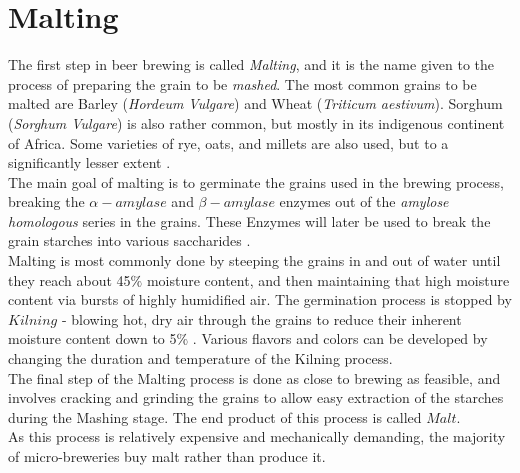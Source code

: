 \documentclass[twoside]{ctuthesis}
\theoremstyle{plain}
\theoremstyle{definition}
\theoremstyle{note}
\begin{document}
\section{Malting}
The first step in beer brewing is called \textit{Malting}, and it is the name given to the process of preparing the grain to be \textit{mashed}. The most common grains to be malted are Barley (\textit{Hordeum Vulgare}) and Wheat (\textit{Triticum aestivum}). Sorghum (\textit{Sorghum Vulgare}) is also rather common, but mostly in its indigenous continent of Africa. Some varieties of rye, oats, and millets are also used, but to a significantly lesser extent \cite{Brewing_Science}.\\
The main goal of malting is to germinate the grains used in the brewing process, breaking the $\alpha-amylase$ and $\beta-amylase$ enzymes out of the \textit{amylose homologous} series in the grains. These Enzymes will later be used to break the grain starches into various saccharides .\\
Malting is most commonly done by steeping the grains in and out of water until they reach about 45$\%$ moisture content, and then maintaining that high moisture content via bursts of highly humidified air. The germination process is stopped by $Kilning$ - blowing hot, dry air through the grains to reduce their inherent moisture content down to 5$\%$ \cite{Malting_Brewing}. Various flavors and colors can be developed by changing the duration and temperature of the Kilning process. \cite{Malting} \\
The final step of the Malting process is done as close to brewing as feasible, and involves cracking and grinding the grains to allow easy extraction of the starches during the Mashing stage. The end product of this process is called $Malt$.\\
As this process is relatively expensive and mechanically demanding, the majority of micro-breweries buy malt rather than produce it.
\end{document}
